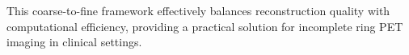 \documentclass[
reprint,
superscriptaddress,
nofootinbib,
amsmath,amssymb,
aps,
prd,
]{revtex4-2}
\begin{document}




This coarse-to-fine framework effectively balances reconstruction quality with computational efficiency, providing a practical solution for incomplete ring PET imaging in clinical settings.
\end{document}

